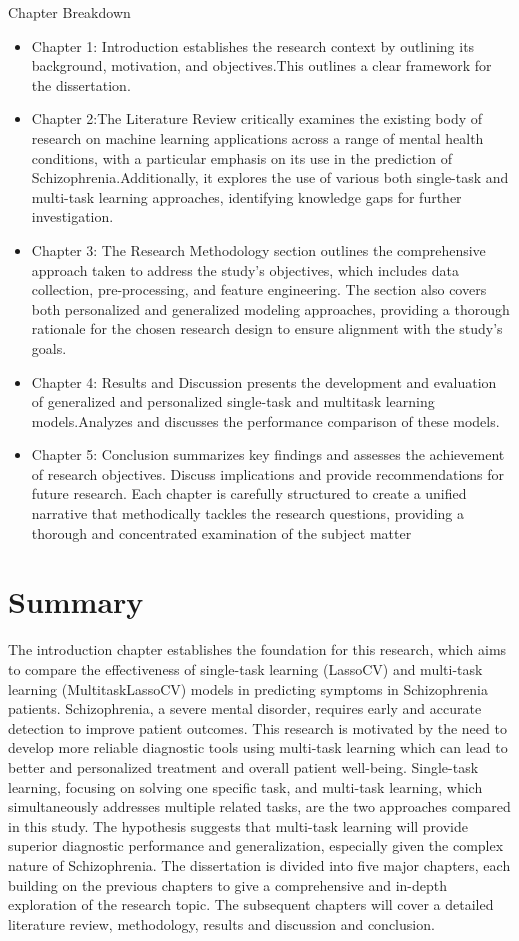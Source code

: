 Chapter Breakdown
\begin{itemize}
\item Chapter 1: Introduction establishes the research context by outlining its background, motivation, and objectives.This outlines a clear framework for the dissertation.
\item Chapter 2:The Literature Review critically examines the existing body of research on machine learning applications across a range of mental health conditions, with a particular emphasis on its use in the prediction of Schizophrenia.Additionally, it explores the use of various both single-task and multi-task learning approaches, identifying knowledge gaps for further investigation.
\item Chapter 3: The Research Methodology section outlines the comprehensive approach taken to address the study’s objectives, which includes  data collection, pre-processing, and feature engineering. The section also covers both personalized and generalized modeling approaches, providing a thorough rationale for the chosen research design to ensure alignment with the study's goals.
\item Chapter 4: Results and Discussion presents the development and evaluation of generalized and personalized single-task and multitask learning models.Analyzes and discusses the performance comparison of these models.
\item Chapter 5: Conclusion summarizes key findings and assesses the achievement of research objectives. Discuss implications and provide recommendations for future research.
Each chapter is carefully structured to create a unified narrative that methodically tackles the research questions, providing a thorough and concentrated examination of the subject matter
\end{itemize}
\section{Summary}
The introduction chapter establishes the foundation for this research, which aims to compare the effectiveness of single-task learning (LassoCV) and multi-task learning (MultitaskLassoCV) models in predicting symptoms in Schizophrenia patients. Schizophrenia, a severe mental disorder, requires early and accurate detection to improve patient outcomes. This research is motivated by the need to develop more reliable diagnostic tools using multi-task learning which can lead to better and personalized treatment and overall patient well-being. Single-task learning, focusing on solving one specific task, and multi-task learning, which simultaneously addresses multiple related tasks, are the two approaches compared in this study. The hypothesis suggests that multi-task learning will provide superior diagnostic performance and generalization, especially given the complex nature of Schizophrenia. The dissertation is divided into five major chapters, each building on the previous chapters to give a comprehensive and in-depth exploration of the research topic. The subsequent chapters will cover a detailed literature review, methodology, results and discussion and conclusion.


